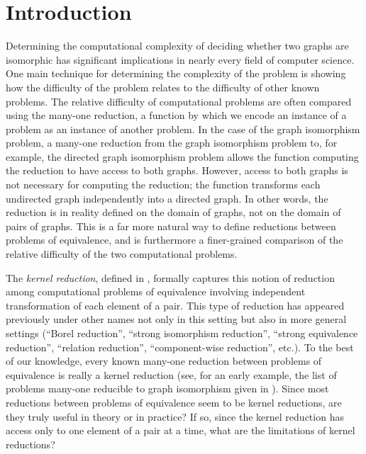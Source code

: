\section{Introduction}

Determining the computational complexity of deciding whether two graphs are isomorphic has significant implications in nearly every field of computer science.
One main technique for determining the complexity of the problem is showing how the difficulty of the problem relates to the difficulty of other known problems.
The relative difficulty of computational problems are often compared using the many-one reduction, a function by which we encode an instance of a problem as an instance of another problem.
In the case of the graph isomorphism problem, a many-one reduction from the graph isomorphism problem to, for example, the directed graph isomorphism problem allows the function computing the reduction to have access to both graphs.
However, access to both graphs is not necessary for computing the reduction; the function transforms each undirected graph independently into a directed graph.
In other words, the reduction is in reality defined on the domain of graphs, not on the domain of pairs of graphs.
This is a far more natural way to define reductions between problems of equivalence, and is furthermore a finer-grained comparison of the relative difficulty of the two computational problems.

The \emph{kernel reduction}, defined in \autocite[Definition~4.13]{fg11}, formally captures this notion of reduction among computational problems of equivalence involving independent transformation of each element of a pair.
This type of reduction has appeared previously under other names not only in this setting but also in more general settings (``Borel reduction'', ``strong isomorphism reduction'', ``strong equivalence reduction'', ``relation reduction'', ``component-wise reduction'', etc.).
To the best of our knowledge, every known many-one reduction between problems of equivalence is really a kernel reduction (see, for an early example, the list of problems many-one reducible to graph isomorphism given in \autocite{bc79}).
Since most reductions between problems of equivalence seem to be kernel reductions, are they truly useful in theory or in practice?
If so, since the kernel reduction has access only to one element of a pair at a time, what are the limitations of kernel reductions?

